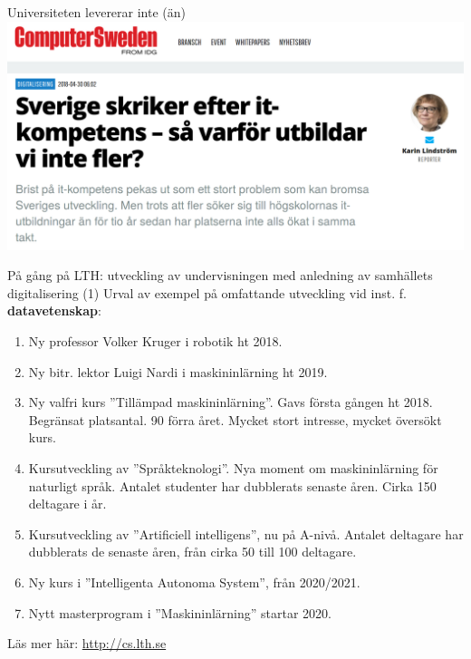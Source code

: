 \documentclass[aspectratio=169]{beamer}
\newenvironment{Slide}[1]%
  {\begin{frame}[environment=Slide]{#1}}
  {\end{frame}}%
\begin{document}
\begin{Slide}{Universiteten levererar inte (än)}
\includegraphics[height=0.75\textheight]{../../img/utbilda-fler}
\end{Slide}


\begin{Slide}{På gång på LTH: utveckling av undervisningen med anledning av samhällets digitalisering (1)}
  Urval av exempel på omfattande utveckling vid inst. f. \textbf{datavetenskap}: 
  \begin{enumerate}
    \item Ny professor Volker Kruger i robotik ht 2018. 
    \item Ny bitr. lektor Luigi Nardi i maskininlärning ht 2019. 
    \item Ny valfri kurs ''Tillämpad maskininlärning''. Gavs första gången ht 2018. Begränsat platsantal. 90 förra året. Mycket stort intresse, mycket översökt kurs.
    \item Kursutveckling av ''Språkteknologi''. Nya moment om maskininlärning för naturligt språk.  Antalet studenter har dubblerats senaste åren. Cirka 150 deltagare i år.
    \item Kursutveckling av ''Artificiell intelligens'', nu på A-nivå. Antalet deltagare har dubblerats de senaste åren, från cirka 50 till 100 deltagare.
    \item Ny kurs i ''Intelligenta Autonoma System'', från 2020/2021.
    \item Nytt masterprogram i ''Maskininlärning'' startar 2020.
  \end{enumerate}
  Läs mer här: \url{http://cs.lth.se}
\end{Slide}
\end{document}
